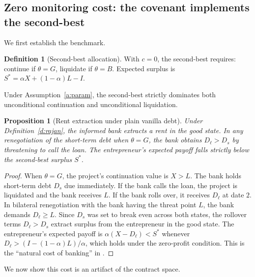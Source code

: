 \documentclass[12pt,a4paper]{article}
\theoremstyle{plain}
\newtheorem{proposition}[theorem]{Proposition}
\theoremstyle{definition}
\newtheorem{definition}[theorem]{Definition}
\theoremstyle{remark}
\begin{document}
\subsection{Zero monitoring cost: the covenant implements the second-best}

We first establish the benchmark.

\begin{definition}[Second-best allocation]\label{d:sb}
With $c=0$, the second-best requires: continue if $\theta = G$, liquidate if $\theta = B$. Expected surplus is $S^* = \alpha X + (1-\alpha)L - I$.
\end{definition}

Under Assumption~\ref{a:param}, the second-best strictly dominates both unconditional continuation and unconditional liquidation.

\begin{proposition}[Rent extraction under plain vanilla debt]\label{p:rajan}
Under Definition~\ref{d:rajan}, the informed bank extracts a rent in the good state. In any renegotiation of the short-term debt when $\theta = G$, the bank obtains $D_\ell > D_s$ by threatening to call the loan. The entrepreneur's expected payoff falls strictly below the second-best surplus $S^*$.
\end{proposition}

\begin{proof}
When $\theta = G$, the project's continuation value is $X > L$. The bank holds short-term debt $D_s$ due immediately. If the bank calls the loan, the project is liquidated and the bank receives $L$. If the bank rolls over, it receives $D_\ell$ at date $2$. In bilateral renegotiation with the bank having the threat point $L$, the bank demands $D_\ell \geq L$. Since $D_s$ was set to break even across both states, the rollover terms $D_\ell > D_s$ extract surplus from the entrepreneur in the good state. The entrepreneur's expected payoff is $\alpha(X - D_\ell) < S^*$ whenever $D_\ell > (I - (1-\alpha)L)/\alpha$, which holds under the zero-profit condition. This is the ``natural cost of banking'' in \citet{rajan1992}.
\end{proof}

We now show this cost is an artifact of the contract space.
\end{document}
